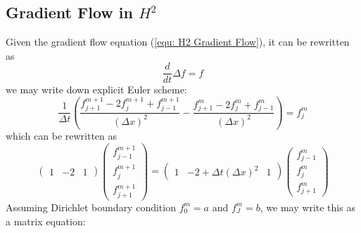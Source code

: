 \documentclass[a4paper]{article}
\theoremstyle{definition}
\begin{document}
\subsection{Gradient Flow in $H^2$}
Given the gradient flow equation (\ref{equ: H2 Gradient Flow}), it can be rewritten as
\begin{equation}
    \frac{d}{dt} \Delta f = f
\end{equation}
we may write down explicit Euler scheme:
\begin{equation}
    \frac{1}{\Delta t}\left( \frac{f_{j+1}^{m+1} - 2f_j^{m+1} + f_{j-1}^{m+1}}{\left( \Delta x \right)^2} - \frac{f_{j+1}^{m} - 2f_j^{m} + f_{j-1}^{m}}{\left( \Delta x \right)^2} \right) = f_j^m
    \label{equ: H2 Numeric}
\end{equation}
which can be rewritten as
\begin{equation}
    \begin{pmatrix}
        1 & -2 & 1
    \end{pmatrix}
    \begin{pmatrix}
        f_{j-1}^{m+1} \\
        f_{j}^{m+1} \\
        f_{j+1}^{m+1}
    \end{pmatrix}
    =
    \begin{pmatrix}
        1 & -2 + \Delta t (\Delta x)^2 & 1
    \end{pmatrix}
    \begin{pmatrix}
        f_{j-1}^{m} \\
        f_{j}^{m} \\
        f_{j+1}^{m}
    \end{pmatrix}
\end{equation}
Assuming Dirichlet boundary condition $f_0^m = a$ and $f_J^m = b$,
we may write this as a matrix equation:
\end{document}
